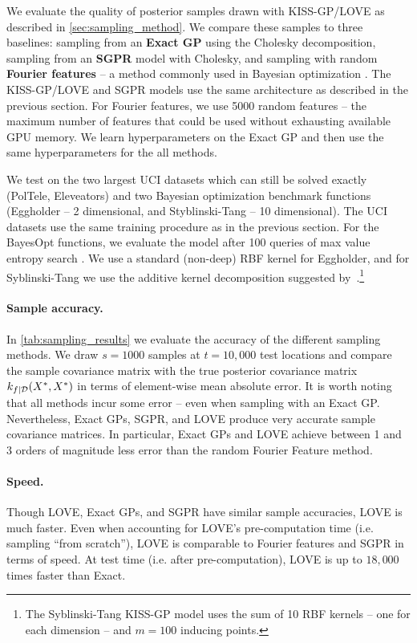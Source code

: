 We evaluate the quality of posterior samples drawn with KISS-GP/LOVE{} as described in \autoref{sec:sampling_method}.
We compare these samples to three baselines: sampling from an {\bf Exact GP} using the Cholesky decomposition, sampling from an {\bf SGPR} model with Cholesky, and sampling with random {\bf Fourier features} \citep{rahimi2008random} -- a method commonly used in Bayesian optimization \cite{hernandez2014predictive,wang2017max}.
The KISS-GP/LOVE{} and SGPR models use the same architecture as described in the previous section.
For Fourier features, we use 5000 random features -- the maximum number of features that could be used without exhausting available GPU memory.
We learn hyperparameters on the Exact GP and then use the same hyperparameters for the all methods.

We test on the two largest UCI datasets which can still be solved exactly (PolTele, Eleveators) and two Bayesian optimization benchmark functions (Eggholder -- 2 dimensional, and Styblinski-Tang -- 10 dimensional).
The UCI datasets use the same training procedure as in the previous section.
For the BayesOpt functions, we evaluate the model after 100 queries of max value entropy search \cite{wang2017max}.
We use a standard (non-deep) RBF kernel for Eggholder, and for Syblinski-Tang we use the additive kernel decomposition suggested by~\citet{kandasamy2015high}.\footnote{
  The Syblinski-Tang KISS-GP model uses the sum of 10 RBF kernels -- one for each dimension -- and $m=100$ inducing points.
}

\paragraph{Sample accuracy.}
In \autoref{tab:sampling_results} we evaluate the accuracy of the different sampling methods.
We draw $s\!=\!1000$ samples at $t\!=\!10,\!000$ test locations and compare the sample covariance matrix with the true posterior covariance matrix $k_{f\mid\mathcal D}(X^*,X^*)$ in terms of element-wise mean absolute error.
It is worth noting that all methods incur some error -- even when sampling with an Exact GP.
Nevertheless, Exact GPs, SGPR, and LOVE{} produce very accurate sample covariance matrices.
In particular, Exact GPs and LOVE{} achieve between 1 and 3 orders of magnitude less error than the random Fourier Feature method.

\paragraph{Speed.}
Though LOVE{}, Exact GPs, and SGPR have similar sample accuracies, LOVE{} is much faster.
Even when accounting for LOVE's pre-computation time (i.e. sampling ``from scratch''), LOVE{} is comparable to Fourier features and SGPR in terms of speed.
At test time (i.e. after pre-computation), LOVE{} is up to $18,\!000$ times faster than Exact.

